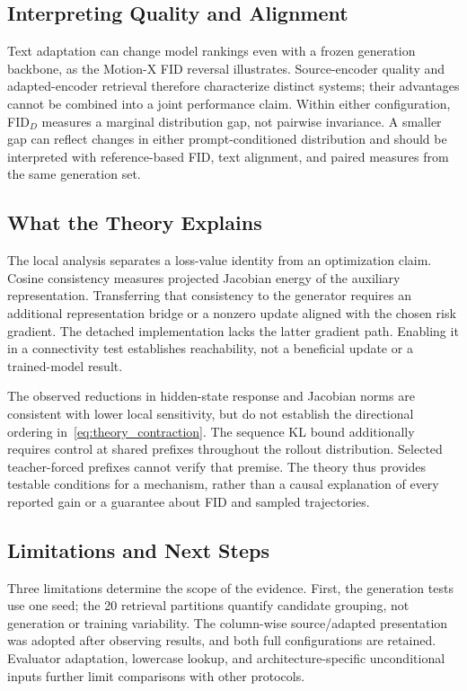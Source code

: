 \subsection{Interpreting Quality and Alignment}
Text adaptation can change model rankings even with a frozen generation
backbone, as the Motion-X FID reversal illustrates. Source-encoder quality
and adapted-encoder retrieval therefore characterize distinct systems; their
advantages cannot be combined into a joint performance claim.
Within either configuration, FID$_D$ measures a marginal distribution gap,
not pairwise invariance. A smaller gap can reflect changes in either
prompt-conditioned distribution and should be interpreted with reference-based
FID, text alignment, and paired measures from the same generation set.

\subsection{What the Theory Explains}
The local analysis separates a loss-value identity from an optimization claim.
Cosine consistency measures projected Jacobian energy of the auxiliary
representation. Transferring that consistency to the generator requires an
additional representation bridge or a nonzero update aligned with the chosen
risk gradient. The detached implementation lacks the latter gradient path.
Enabling it in a connectivity test establishes reachability, not a beneficial
update or a trained-model result.

The observed reductions in hidden-state response and Jacobian norms are
consistent with lower local sensitivity, but do not establish the directional
ordering in~\eqref{eq:theory_contraction}. The sequence KL bound additionally
requires control at shared prefixes throughout the rollout distribution.
Selected teacher-forced prefixes cannot verify that premise. The theory thus
provides testable conditions for a mechanism, rather than a causal explanation
of every reported gain or a guarantee about FID and sampled trajectories.

\subsection{Limitations and Next Steps}
Three limitations determine the scope of the evidence. First, the generation
tests use one seed; the 20 retrieval partitions quantify candidate grouping,
not generation or training variability. The column-wise source/adapted
presentation was adopted after observing results, and both full configurations
are retained. Evaluator adaptation, lowercase lookup, and architecture-specific
unconditional inputs further limit comparisons with other protocols.

